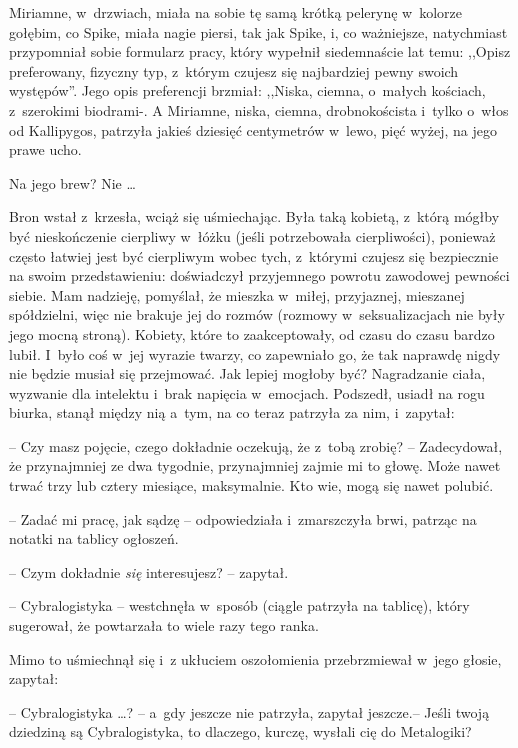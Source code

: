 \documentclass[oneside,polish,11pt,rmheadings]{mwbk}
\begin{document}
Miriamne, w~drzwiach, miała na sobie tę samą krótką pelerynę w~kolorze gołębim, co Spike, miała nagie piersi, tak jak Spike, i, co ważniejsze, natychmiast przypomniał sobie formularz pracy, który wypełnił siedemnaście lat temu: ,,Opisz preferowany, fizyczny typ, z~którym czujesz się najbardziej pewny swoich występów''. Jego opis preferencji brzmiał: ,,Niska, ciemna, o~małych kościach, z~szerokimi biodrami-. A Miriamne, niska, ciemna, drobnokoścista i~tylko o~włos od Kallipygos, patrzyła jakieś dziesięć centymetrów w~lewo, pięć wyżej, na jego prawe ucho. 

Na jego brew? Nie  \ldots  

Bron wstał z~krzesła, wciąż się uśmiechając. Była taką kobietą, z~którą mógłby być nieskończenie cierpliwy w~łóżku (jeśli potrzebowała cierpliwości), ponieważ często łatwiej jest być cierpliwym wobec tych, z~którymi czujesz się bezpiecznie na swoim przedstawieniu: doświadczył przyjemnego powrotu zawodowej pewności siebie. Mam nadzieję, pomyślał, że mieszka w~miłej, przyjaznej, mieszanej spółdzielni, więc nie brakuje jej do rozmów (rozmowy w~seksualizacjach nie były jego mocną stroną). Kobiety, które to zaakceptowały, od czasu do czasu bardzo lubił. I~było coś w~jej wyrazie twarzy, co zapewniało go, że tak naprawdę nigdy nie będzie musiał się przejmować. Jak lepiej mogłoby być? Nagradzanie ciała, wyzwanie dla intelektu i~brak napięcia w~emocjach. Podszedł, usiadł na rogu biurka, stanął między nią a~tym, na co teraz patrzyła za nim, i~zapytał:  

-- Czy masz pojęcie, czego dokładnie oczekują, że z~tobą zrobię? -- Zadecydował, że przynajmniej ze dwa tygodnie, przynajmniej zajmie mi to głowę. Może nawet trwać trzy lub cztery miesiące, maksymalnie. Kto wie, mogą się nawet polubić. 

-- Zadać mi pracę, jak sądzę -- odpowiedziała i~zmarszczyła brwi, patrząc na notatki na tablicy ogłoszeń. 

-- Czym dokładnie \textit{się } interesujesz? -- zapytał. 

-- Cybralogistyka -- westchnęła w~sposób (ciągle patrzyła na tablicę), który sugerował, że powtarzała to wiele razy tego ranka. 

Mimo to uśmiechnął się i~z ukłuciem oszołomienia przebrzmiewał w~jego głosie, zapytał: 

-- Cybralogistyka \ldots ? -- a~gdy jeszcze nie patrzyła, zapytał jeszcze.-- Jeśli twoją dziedziną są Cybralogistyka, to dlaczego, kurczę, wysłali cię do Metalogiki?
\end{document}
